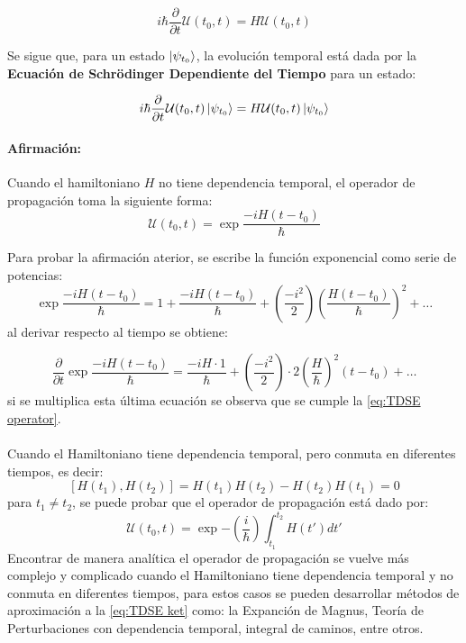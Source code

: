 \begin{equation}
  \label{eq:TDSE operator}
  i\hbar\frac{\partial}{\partial t}\mathcal{U}(t_0,t) = H\mathcal{U}(t_0,t)
\end{equation}

Se sigue que, para un estado $\ket{\psi_{t_0}}$, la evolución temporal está dada por la \textbf{Ecuación de Schrödinger Dependiente del Tiempo} para un estado:

\begin{tcolorbox}[colback=CTtitle!5!white,colframe=CTtitle!85!white]%
\begin{equation}
\label{eq:TDSE ket}
i\hbar\frac{\partial}{\partial t}\mathcal{U}(t_0,t)\ket{\psi_{t_0}} = H\mathcal{U}(t_0,t)\ket{\psi_{t_0}}
\end{equation}
\end{tcolorbox}

\paragraph{Afirmación:}
  Cuando el hamiltoniano $H$ no tiene dependencia temporal, el operador de propagación toma la siguiente forma:
\begin{equation}
\label{eq:U IT}
\mathcal{U}(t_0,t) = \exp{\frac{-iH(t-t_0)}{\hbar}}
\end{equation}

Para probar la afirmación aterior, se escribe la función exponencial como serie de potencias:
$$\exp{\frac{-iH(t-t_0)}{\hbar}} = 1 + \frac{-iH(t-t_0)}{\hbar}+ \left(\frac{-i^2}{2}\right)\left(\frac{H(t-t_0)}{\hbar}\right)^2+\dots $$
al derivar respecto al tiempo se obtiene:

$$\frac{\partial}{\partial t}\exp{\frac{-iH(t-t_0)}{\hbar}} = \frac{-iH\cdot 1}{\hbar}+ \left(\frac{-i^2}{2}\right)\cdot 2\left(\frac{H}{\hbar}\right)^2(t-t_0)+\dots $$
si se multiplica esta última ecuación se observa que se cumple la \autoref{eq:TDSE operator}.
\\\\
Cuando el Hamiltoniano tiene dependencia temporal, pero conmuta en diferentes tiempos, es decir:
$$[H(t_1), H(t_2)] = H(t_1)H(t_2) - H(t_2)H(t_1)=0$$
para $t_1 \neq t_2$, se puede probar que el operador de propagación está dado por:
$$\mathcal{U}(t_0,t) = \exp{-\left( \frac{i}{\hbar}\right)\int_{t_1}^{t_2}H(t')dt'}$$
Encontrar de manera analítica el operador de propagación se vuelve más complejo y complicado cuando el Hamiltoniano tiene dependencia temporal y no conmuta en diferentes tiempos, para estos casos se pueden desarrollar métodos de aproximación a la \autoref{eq:TDSE ket} como: la Expanción de Magnus, Teoría de Perturbaciones con dependencia temporal, integral de caminos, entre otros.


